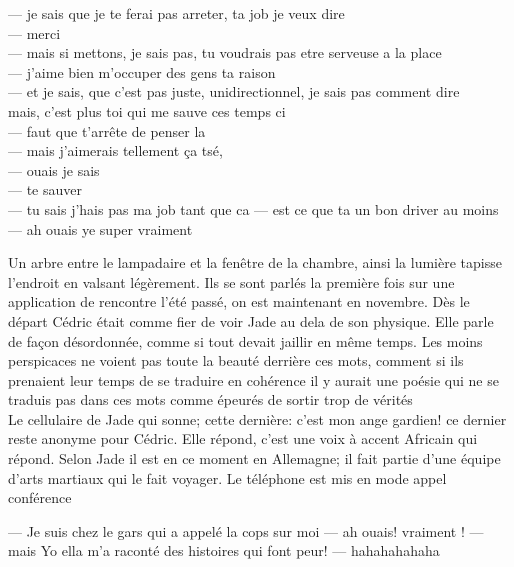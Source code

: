 --- je sais que je te ferai pas arreter, ta job je veux dire\\
--- merci\\
--- mais si mettons, je sais pas, tu voudrais pas etre serveuse a la place\\
--- j'aime bien m'occuper des gens ta raison\\
--- et je sais, que c'est pas juste, unidirectionnel, je sais pas comment dire\\
mais, c'est plus toi qui me sauve ces temps ci\\
--- faut que t'arrête de penser la\\
--- mais j'aimerais tellement ça tsé,\\
--- ouais je sais\\
--- te sauver\\
--- tu sais j'hais pas ma job tant que ca
--- est ce que ta un bon driver au moins
--- ah ouais ye super vraiment


Un arbre entre le lampadaire et la fenêtre de la chambre, ainsi la lumière
tapisse l'endroit en valsant légèrement. Ils se sont parlés la première fois sur
une application de rencontre l'été passé, on est maintenant en novembre. Dès le
départ Cédric était comme fier de voir Jade au dela de son physique. Elle parle
de façon désordonnée, comme si tout devait jaillir en même temps. Les moins
perspicaces ne voient pas toute la beauté derrière ces mots, comment si ils
prenaient leur temps de se traduire en cohérence il y aurait une poésie qui ne
se traduis pas dans ces mots comme épeurés de sortir trop de vérités\\


Le cellulaire de Jade qui sonne; cette dernière: c'est mon ange gardien!
ce dernier reste anonyme pour Cédric. Elle répond, c'est une voix à accent
Africain qui répond. Selon Jade il est en ce moment en Allemagne; il fait partie
d'une équipe d'arts martiaux qui le fait voyager. Le téléphone est mis en mode
appel conférence

--- Je suis chez le gars qui a appelé la cops sur moi
--- ah ouais! vraiment !
--- mais Yo ella m'a raconté des histoires qui font peur!
--- hahahahahaha
